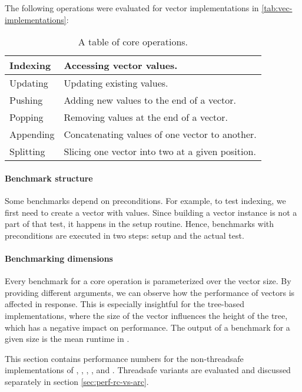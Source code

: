 The following operations were evaluated for vector implementations in \ref{tab:vec-implementations}:
\begin{table}[!htbp]
    \centering

    \begin{tabular} { |l| p{10cm} | }
        \hline
        Indexing & Accessing vector values. \\ \hline
        Updating & Updating existing values. \\ \hline
        Pushing & Adding new values to the end of a vector. \\ \hline
        Popping & Removing values at the end of a vector. \\ \hline
        Appending & Concatenating values of one vector to another. \\ \hline
        Splitting & Slicing one vector into two at a given position. \\ \hline
    \end{tabular}

    \label{tab:vec-core-operations}
    \caption{A table of core operations.}
\end{table}

\paragraph{Benchmark structure}
Some benchmarks depend on preconditions. For example, to test indexing, we first need to create a vector with values. Since building a vector instance is not a part of that test, it happens in the setup routine. Hence, benchmarks with preconditions are executed in two steps: setup and the actual test.

\paragraph{Benchmarking dimensions}
Every benchmark for a core operation is parameterized over the vector size. By providing different arguments, we can observe how the performance of vectors is affected in response. This is especially insightful for the tree-based implementations, where the size of the vector influences the height of the tree, which has a negative impact on performance. The output of a benchmark for a given size is the mean runtime in \millis{}.

\label{sec:perf-seq}
This section contains performance numbers for the non-threadsafe implementations of \stdvec{}, \rbvec{}, \rrbvec{}, \pvec{}, and \imrsvec{}. Threadsafe variants are evaluated and discussed separately in section \ref{sec:perf-rc-vs-arc}.

